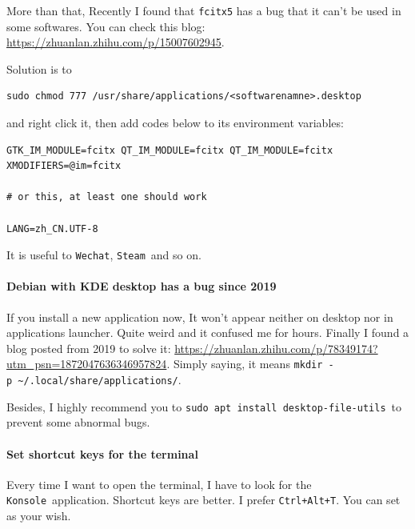 \documentclass[12pt]{ctexart}
\begin{document}
More than that, Recently I found that \texttt{fcitx5} has a bug that it
can't be used in some softwares. You can check this
blog: \url{https://zhuanlan.zhihu.com/p/15007602945}.

Solution is to

\fontsize{8}{10}
\begin{adjustwidth}{2em}{0pt}
\begin{verbatim}
sudo chmod 777 /usr/share/applications/<softwarenamne>.desktop
\end{verbatim}
\end{adjustwidth}
\fontsize{12}{14}

and right click it, then add codes below to its environment variables:

\fontsize{8}{10}
\begin{adjustwidth}{2em}{0pt}
\begin{verbatim}
GTK_IM_MODULE=fcitx QT_IM_MODULE=fcitx QT_IM_MODULE=fcitx XMODIFIERS=@im=fcitx

# or this, at least one should work

LANG=zh_CN.UTF-8
\end{verbatim}
\end{adjustwidth}
\fontsize{12}{14}

It is useful to \texttt{Wechat}, \texttt{Steam}\ and so on.

\paragraph{\textbf{Debian with KDE desktop has a bug since 2019}}\par
\vspace{1em}
If you install a new application now, It won't appear
neither on desktop nor in applications launcher. Quite weird and it
confused me for hours. Finally I found a blog posted from 2019 to solve
it:
\url{https://zhuanlan.zhihu.com/p/78349174?utm_psn=1872047636346957824}.
Simply saying, it means
\texttt{mkdir\ -p\ \textasciitilde{}/.local/share/applications/}.

Besides, I highly recommend you to
\texttt{sudo\ apt\ install\ desktop-file-utils}\ to prevent some abnormal
bugs.

\paragraph{\textbf{Set shortcut keys for the terminal}}\par
\vspace{1em}
Every time I want to open the terminal, I have to look for the
\texttt{Konsole}\ application. Shortcut keys are better. I prefer
\texttt{Ctrl+Alt+T}. You can set as your wish.
\end{document}

